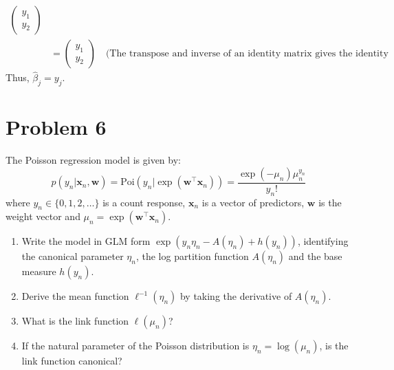 \documentclass[11pt,twoside]{article}
\newcommand{\pts}[1]{\marginpar{ \small\hspace{0pt} \textit{[#1]} } }
\newcommand{\?}{\stackrel{?}{=}}
\newcommand{\fr}{\frac}
\newcommand{\bl}{\color{blue!80!black}}
\newenvironment{solution}
{\medskip\par\begin{adjustwidth}{.01\textwidth}{.01\textwidth}\bl}{\medskip\end{adjustwidth}}
\begin{document}
\begin{enumerate}[\bf (a)]
\begin{solution}
\begin{align*}
\begin{pmatrix}
                                                              y_1 \\ y_2
                                                            \end{pmatrix}\\
                &=
                  \begin{pmatrix}
                    y_1 \\ y_2
                  \end{pmatrix} \quad \text{(The transpose and inverse of an identity matrix gives the identity matrix)}
    \end{align*}
    Thus, $\hat \beta_j = y_j$.
  \end{solution}
  
 
\end{enumerate}

\bigskip
\section*{Problem 6 }
The Poisson regression model is given by:
\begin{equation}
  p(y_n|\bm x_n, \bm w) = \text{Poi}(y_n|\exp(\bm w^\intercal \bm x_n)) = 
  \fr{\exp(-\mu_n)\mu_n^{y_n}}{y_n!}
\end{equation}
where $y_n \in \{0,1,2,\ldots\}$ is a count response, $\bm x_n$ is a vector of predictors, $\bm w$ is the weight vector and $\mu_n = \exp(\bm w^\intercal \bm x_n)$.

\begin{enumerate}[\bf(a)]
  \item Write the model in GLM form $\exp(y_n\eta_n - A(\eta_n) + h(y_n))$, identifying the canonical parameter $\eta_n$, the log partition function $A(\eta_n)$ and the base measure $h(y_n)$. \pts{8}
  \item Derive the mean function $\ell^{-1}(\eta_n)$ by taking the derivative of $A(\eta_n)$. \pts{2}
  \item What is the link function $\ell(\mu_n)$? \pts{1}
  \item If the natural parameter of the Poisson distribution is $\eta_n = \log(\mu_n)$, is the link function canonical? \pts{1}
\end{enumerate}
\end{document}
